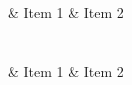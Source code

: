 \documentclass[twocolumn,12pt,a4paper]{article}
\begin{document}
\title{}
\author{}
\maketitle

\section*{}

\begin{easylist}[checklist]
    & Item 1
    & Item 2
\end{easylist}

\newpage

\section*{}

\begin{easylist}[checklist]
    & Item 1
    & Item 2
\end{easylist}
\end{document}
